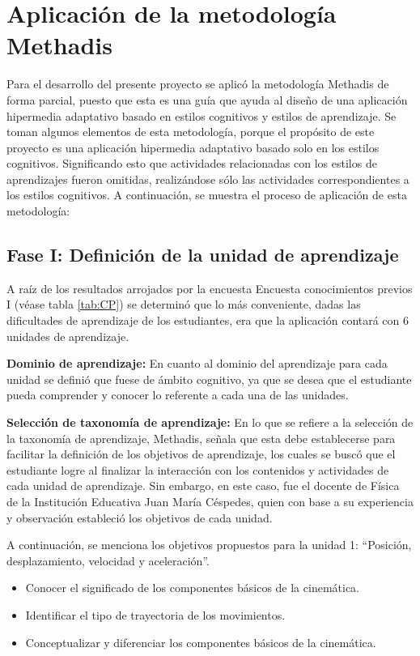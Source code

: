 \section{Aplicación de la metodología Methadis}
Para el desarrollo del presente proyecto se aplicó la metodología Methadis de forma parcial, puesto que esta es una guía que ayuda al diseño de una aplicación hipermedia adaptativo basado en estilos cognitivos y estilos de aprendizaje. Se toman algunos elementos de esta metodología, porque el propósito de este proyecto es una aplicación hipermedia adaptativo basado solo en los estilos cognitivos. Significando esto que actividades relacionadas con los estilos de aprendizajes fueron omitidas, realizándose sólo las actividades correspondientes a los estilos cognitivos. A continuación, se muestra el proceso de aplicación de esta metodología:

\subsection{Fase I: Definición de la unidad de aprendizaje }
A raíz de los resultados arrojados por la encuesta Encuesta conocimientos previos I (véase tabla \ref{tab:CP}) se determinó que lo más conveniente, dadas las dificultades de aprendizaje de los estudiantes, era que la aplicación contará con 6 unidades de aprendizaje.

\textbf{Dominio de aprendizaje: } En cuanto al dominio del aprendizaje para cada unidad se definió que fuese de ámbito cognitivo, ya que se desea que el estudiante pueda comprender y conocer lo referente a cada una de las unidades.

\textbf{Selección de taxonomía de aprendizaje:}
En lo que se refiere a la selección de la taxonomía de aprendizaje, Methadis, señala que esta debe establecerse para facilitar la definición de los objetivos de aprendizaje, los cuales se buscó que el estudiante logre al finalizar la interacción con los contenidos y actividades de cada unidad de aprendizaje. Sin embargo, en este caso, fue el docente de Física de la Institución Educativa Juan María Céspedes, quien con base a su experiencia y observación estableció los objetivos de cada unidad.

A continuación, se menciona los objetivos propuestos para la unidad 1: “Posición, desplazamiento, velocidad y aceleración”.  

\begin{itemize}
    \item Conocer el significado de los componentes básicos de la cinemática.
    \item Identificar el tipo de trayectoria de los movimientos.
    \item Conceptualizar y diferenciar los componentes básicos de la cinemática.
\end{itemize}

